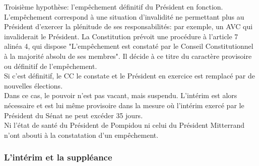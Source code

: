 \documentclass[12pt, a4paper, openany]{book}
\begin{document}
Troisième hypothèse: l'empêchement définitif du Président en fonction. L'empêchement correspond à une situation d'invalidité ne permettant plus au Président d'exercer la plénitude de ses responsabilités: par exemple, un AVC qui invaliderait le Président. La Constitution prévoit une procédure à l'article 7 alinéa 4, qui dispose "L'empêchement est constaté par le Conseil Constitutionnel à la majorité absolu de ses membres". Il décide à ce titre du caractère provisoire ou définitif de l'empêchement. \\ 
Si c'est définitif, le CC le constate et le Président en exercice est remplacé par de nouvelles élections. \\
Dans ce cas, le pouvoir n'est pas vacant, mais suspendu. L'intérim est alors nécessaire et est lui même provisoire dans la mesure où l'intérim exercé par le Président du Sénat ne peut excéder 35 jours. \\
Ni l'état de santé du Président de Pompidou ni celui du Président Mitterrand n'ont abouti à la constatation d'un empêchement. \\


\subsubsection{L'intérim et la suppléance}
\end{document}
